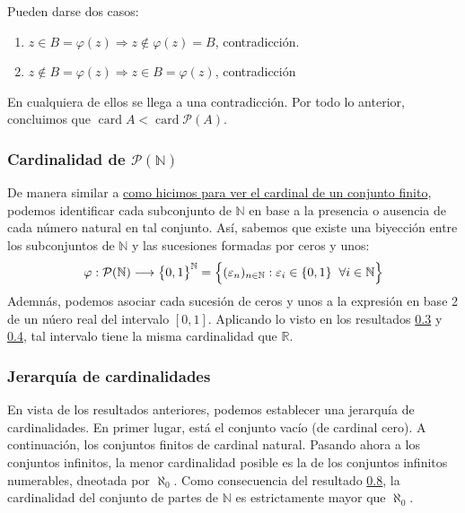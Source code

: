 \documentclass[12pt,a4paper]{article}
\newcommand{\card}{\operatorname{card}}
\newcommand{\R}{\mathbb{R}}
\newcommand{\N}{\mathbb{N}}
\begin{document}
\noindent
Pueden darse dos casos:
\begin{enumerate}[label=\arabic*.)]
    \item $z \in B = \varphi(z) \Rightarrow z \notin \varphi(z) = B$, contradicción.
    \item $z \notin B = \varphi(z) \Rightarrow z \in B = \varphi(z)$, contradicción
\end{enumerate}
En cualquiera de ellos se llega a una contradicción. Por todo lo anterior, concluimos que $\card A < \card \mathcal{P}(A)$.

\vspace{6mm}
\subsubsection{Cardinalidad de \texorpdfstring{$\mathcal{P}(\N)$}{P(N)}}
\hspace{3mm} De manera similar a \hyperref[subsubsection:0.7]{como hicimos para ver el cardinal de un conjunto finito}, podemos identificar cada
subconjunto de $\N$ en base a la presencia o ausencia de cada número natural en tal conjunto. Así, sabemos que existe una biyección entre los subconjuntos
de $\N$ y las sucesiones formadas por ceros y unos:
$$\varphi : \mathcal{P}(\N) \longrightarrow \big\{0,1\big\}^\N = \Big\{(\varepsilon_n)_{n \in \N} : \varepsilon_i \in \{0,1\} \hspace{2mm}  \forall i \in \N\Big\}$$
Ademnás, podemos asociar cada sucesión de ceros y unos a la expresión en base 2 de un núero real del intervalo $[0,1]$. Aplicando lo visto en los
resultados \hyperref[subsubsection:0.3]{0.3} y \hyperref[subsubsection:0.4]{0.4}, tal intervalo tiene la misma cardinalidad que $\R$.

\vspace{6mm}
\subsubsection{Jerarquía de cardinalidades}
\hspace{3mm}    
En vista de los resultados anteriores, podemos establecer una jerarquía de cardinalidades. En primer lugar, está el conjunto vacío (de cardinal cero).
A continuación, los conjuntos finitos de cardinal natural. Pasando ahora a los conjuntos infinitos, la menor cardinalidad posible es la de los conjuntos
infinitos numerables, dneotada por $\aleph_0$. Como consecuencia del resultado \hyperref[subsubsection:0.8]{0.8}, la cardinalidad del conjunto de partes de $\N$ es estrictamente mayor que $\aleph_0$.
\end{document}
